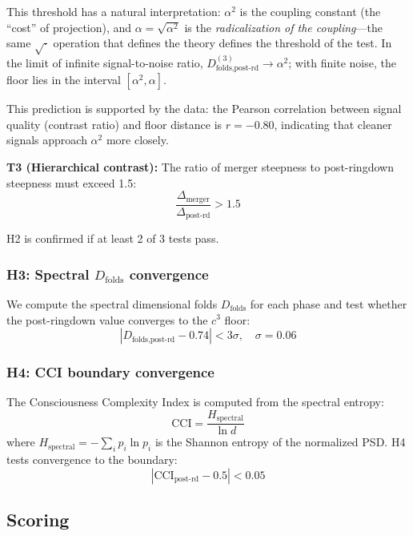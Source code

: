 \documentclass[12pt,a4paper,twocolumn]{article}
\newcommand{\alphaii}{\alpha^{2}}
\newcommand{\Dfolds}{D_{\text{folds}}}
\newcommand{\CCI}{\text{CCI}}
\begin{document}
This threshold has a natural interpretation: $\alphaii$ is the coupling constant (the ``cost'' of projection), and $\alpha = \sqrt{\alphaii}$ is the \emph{radicalization of the coupling}---the same $\sqrt{\cdot}$ operation that defines the theory defines the threshold of the test. In the limit of infinite signal-to-noise ratio, $D_{\text{folds},\text{post-rd}}^{(3)} \to \alphaii$; with finite noise, the floor lies in the interval $[\alphaii, \alpha]$.

This prediction is supported by the data: the Pearson correlation between signal quality (contrast ratio) and floor distance is $r = -0.80$, indicating that cleaner signals approach $\alphaii$ more closely.

\textbf{T3 (Hierarchical contrast):} The ratio of merger steepness to post-ringdown steepness must exceed 1.5:
\begin{equation}
\frac{\Delta_{\text{merger}}}{\Delta_{\text{post-rd}}} > 1.5
\end{equation}

H2 is confirmed if at least 2 of 3 tests pass.

\subsubsection{H3: Spectral $\Dfolds$ convergence}

We compute the spectral dimensional folds $\Dfolds$ for each phase and test whether the post-ringdown value converges to the $c^3$ floor:
\begin{equation}
|D_{\text{folds,post-rd}} - 0.74| < 3\sigma, \quad \sigma = 0.06
\end{equation}

\subsubsection{H4: CCI boundary convergence}

The Consciousness Complexity Index is computed from the spectral entropy:
\begin{equation}
\CCI = \frac{H_{\text{spectral}}}{\ln d}
\end{equation}
where $H_{\text{spectral}} = -\sum_i p_i \ln p_i$ is the Shannon entropy of the normalized PSD. H4 tests convergence to the boundary:
\begin{equation}
|\CCI_{\text{post-rd}} - 0.5| < 0.05
\end{equation}

\subsection{Scoring}
\end{document}
